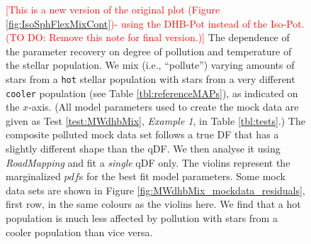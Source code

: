 \documentclass[iop,revtex4]{emulateapj}
\newcommand{\pdf}{\ensuremath{pdf}}
\newcommand{\RM}{{\sl RoadMapping}}
\newcommand{\NOTE}[1]{\textcolor{Red}{#1}}
\begin{document}
\begin{figure}[!htbp]
\caption{\NOTE{[This is a new version of the original plot (Figure \ref{fig:IsoSphFlexMixCont})- using the DHB-Pot instead of the Iso-Pot. (TO DO: Remove this note for final version.)]} The dependence of the parameter recovery on degree of pollution and temperature of the stellar population. We mix (i.e., ``pollute'') varying amounts of stars from a \texttt{hot} stellar population with stars from a very different \texttt{cooler} population (see Table \ref{tbl:referenceMAPs}), as indicated on the $x$-axis. (All model parameters used to create the mock data are given as Test \ref{test:MWdhbMix}, \emph{Example 1}, in Table \ref{tbl:tests}.) The composite polluted mock data set follows a true DF that has a slightly different shape than the qDF. We then analyse it using \RM{} and fit a \emph{single} qDF only. The violins represent the marginalized \pdf{}s for the best fit model parameters.  Some mock data sets are shown in Figure \ref{fig:MWdhbMix_mockdata_residuals}, first row, in the same colours as the violins here.  We find that a hot population is much less affected by pollution with stars from a cooler population than vice versa.}
\label{fig:MWdhbMixCont}
\end{figure}
\end{document}
